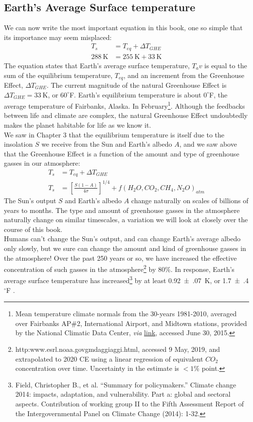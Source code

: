\documentclass[amstex,12pt]{book}
\begin{document}
\subsection{Earth's Average Surface temperature}
We can now write the most important equation in this book, one so simple that its importance may seem misplaced:
\begin{align}
	T_s&=T_{eq}+\Delta T_{GHE}\\
	\SI{288}{\kelvin}&=\SI{255}{\kelvin}+\SI{33}{\kelvin}
\end{align}
The equation states that Earth's average surface temperature, $T_av$ is equal to the sum of the equilibrium temperature, $T_{eq}$, and an increment from the Greenhouse Effect, $\Delta T_{GHE}$. The current magnitude of the natural Greenhouse Effect is $\Delta T_{GHE}=\SI{33}{\kelvin}$, or $60^{\circ}$F. Earth's equilibrium temperature is about $0^{\circ}$F, the average temperature of Fairbanks, Alaska. In February\footnote{Mean temperature climate normals from the 30-years 1981-2010, averaged over Fairbanks AP\#2, International Airport, and Midtown stations, provided by the National Climatic Data Center, \textit{via} \href{http://climate.gi.alaska.edu/Climate/Normals}{link}, accessed June 30, 2015.}. Although the feedbacks between life and climate are complex, the natural Greenhouse Effect undoubtedly makes the planet habitable for life as we know it.\\ 
We saw in Chapter 3 that the equilibrium temperature is itself due to the insolation $S$ we receive from the Sun and Earth's albedo $A$, and we saw above that the Greenhouse Effect is a function of the amount and type of greenhouse gasses in our atmosphere:
\begin{align}
	T_s&=T_{eq}+\Delta T_{GHE}\\ \label{eq:Ts}
	T_s&=\left[\frac{S(1-A)}{4 \sigma}\right]^{1/4} + f(H_2O, CO_2, CH_4, N_2O)_{atm}
\end{align}
The Sun's output $S$ and Earth's albedo $A$ change naturally on scales of billions of years to months. The type and amount of greenhouse gasses in the atmosphere naturally change on similar timescales, a variation we will look at closely over the course of this book.\\ 
Humans can't change the Sun's output, and can change Earth's average albedo only slowly, but we sure can change the amount and kind of greenhouse gasses in the atmosphere! Over the past 250 years or so, we have increased the effective concentration of such gasses in the atmosphere\footnote{http:\/\/www.esrl.noaa.gov\/gmd\/aggi\/aggi.html, accessed 9 May, 2019, and extrapolated to 2020 CE using a linear regression of equivalent $CO_2$ concentration over time. Uncertainty in the estimate is $<1\%$ point.} by 80\%. In response, Earth's average surface temperature has increased\footnote{Field, Christopher B., et al. ``Summary for policymakers.'' Climate change 2014: impacts, adaptation, and vulnerability. Part a: global and sectoral aspects. Contribution of working group II to the Fifth Assessment Report of the Intergovernmental Panel on Climate Change (2014): 1-32.} by at least \SI[separate-uncertainty]{0.92(07)}{\kelvin}, or \SI[separate-uncertainty]{1.7(4)}{} $^{\circ}$F .
\end{document}
